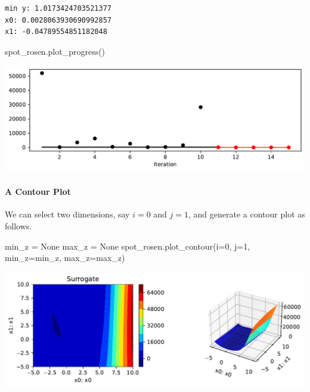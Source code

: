 \documentclass[
  letterpaper,
  DIV=11,
  numbers=noendperiod]{scrreprt}
\let\oldparagraph\paragraph
\renewcommand{\paragraph}[1]{\oldparagraph{#1}\mbox{}}
\newenvironment{Shaded}{\begin{snugshade}}{\end{snugshade}}
\newcommand{\DecValTok}[1]{\textcolor[rgb]{0.68,0.00,0.00}{#1}}
\newcommand{\NormalTok}[1]{\textcolor[rgb]{0.00,0.23,0.31}{#1}}
\newcommand{\OperatorTok}[1]{\textcolor[rgb]{0.37,0.37,0.37}{#1}}
\newcommand{\VariableTok}[1]{\textcolor[rgb]{0.07,0.07,0.07}{#1}}
\begin{document}
\begin{verbatim}
min y: 1.0173424703521377
x0: 0.0028063930690992857
x1: -0.04789554851182048
\end{verbatim}

\begin{Shaded}
\begin{Highlighting}[]
\NormalTok{spot\_rosen.plot\_progress()}
\end{Highlighting}
\end{Shaded}

\includegraphics{009_num_spot_anisotropic_files/figure-pdf/cell-25-output-1.pdf}

\paragraph{A Contour Plot}\label{a-contour-plot-3}

We can select two dimensions, say \(i=0\) and \(j=1\), and generate a
contour plot as follows.

\begin{Shaded}
\begin{Highlighting}[]
\NormalTok{min\_z }\OperatorTok{=} \VariableTok{None}
\NormalTok{max\_z }\OperatorTok{=} \VariableTok{None}
\NormalTok{spot\_rosen.plot\_contour(i}\OperatorTok{=}\DecValTok{0}\NormalTok{, j}\OperatorTok{=}\DecValTok{1}\NormalTok{, min\_z}\OperatorTok{=}\NormalTok{min\_z, max\_z}\OperatorTok{=}\NormalTok{max\_z)}
\end{Highlighting}
\end{Shaded}

\includegraphics{009_num_spot_anisotropic_files/figure-pdf/cell-26-output-1.pdf}
\end{document}
